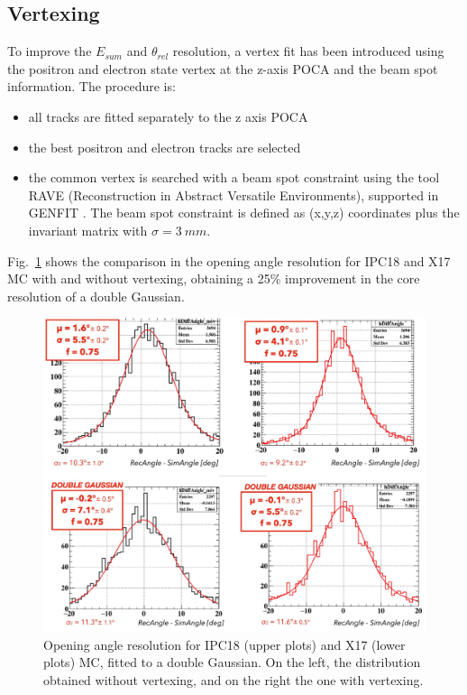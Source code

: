\begin{refsection}
        \subsection{Vertexing}
        To improve the $E_{sum}$ and $\theta_{rel}$ resolution, a vertex fit has been introduced using the positron and electron state vertex at the z-axis POCA and the beam spot information.
        The procedure is:
        \begin{itemize}
            \item all tracks are fitted separately to the z axis POCA
            \item the best positron and electron tracks are selected
            \item the common vertex is searched with a beam spot constraint using the tool RAVE (Reconstruction in Abstract Versatile Environments), supported in GENFIT \cite{RAVE}\cite{GENFIT}. The beam spot constraint is defined as (x,y,z) coordinates plus the invariant matrix with $\sigma =\SI{3}{mm}$. 
        \end{itemize}
        Fig.~\ref{fig:vertexing} shows the comparison in the opening angle resolution for IPC18 and X17 MC with and without vertexing, obtaining a 25$\%$ improvement in the core resolution of a double Gaussian.
        
        \begin{figure}[htbp]
            \centering
            \includegraphics[scale=0.5]{Figures/X17/Analysis/Vertexing.pdf}
            \caption{Opening angle resolution for IPC18 (upper plots) and X17 (lower plots) MC, fitted to a double Gaussian. On the left, the distribution obtained without vertexing, and on the right the one with vertexing.}
             \label{fig:vertexing}
        \end{figure}


\end{refsection}

